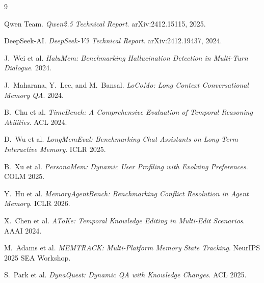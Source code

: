 \documentclass[11pt,a4paper]{article}
\begin{document}
\begin{thebibliography}{9}

Qwen Team.
\textit{Qwen2.5 Technical Report}.
arXiv:2412.15115, 2025.

DeepSeek-AI.
\textit{DeepSeek-V3 Technical Report}.
arXiv:2412.19437, 2024.

J.~Wei et al.
\textit{HaluMem: Benchmarking Hallucination Detection in Multi-Turn Dialogue}.
2024.

J.~Maharana, Y.~Lee, and M.~Bansal.
\textit{LoCoMo: Long Context Conversational Memory QA}.
2024.

B.~Chu et al.
\textit{TimeBench: A Comprehensive Evaluation of Temporal Reasoning Abilities}.
ACL 2024.

D.~Wu et al.
\textit{LongMemEval: Benchmarking Chat Assistants on Long-Term Interactive Memory}.
ICLR 2025.

B.~Xu et al.
\textit{PersonaMem: Dynamic User Profiling with Evolving Preferences}.
COLM 2025.

Y.~Hu et al.
\textit{MemoryAgentBench: Benchmarking Conflict Resolution in Agent Memory}.
ICLR 2026.

X.~Chen et al.
\textit{AToKe: Temporal Knowledge Editing in Multi-Edit Scenarios}.
AAAI 2024.

M.~Adams et al.
\textit{MEMTRACK: Multi-Platform Memory State Tracking}.
NeurIPS 2025 SEA Workshop.

S.~Park et al.
\textit{DynaQuest: Dynamic QA with Knowledge Changes}.
ACL 2025.

\end{thebibliography}
\end{document}
